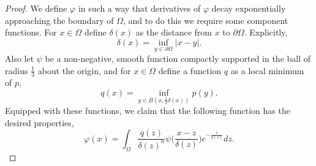 \documentclass[oneside,hidelinks,indentfirst,10pt]{book}
\begin{document}
\begin{proof}
We define \(\varphi\) in such a way that derivatives of \(\varphi\) decay exponentially approaching the boundary of \(\Omega\), and to do this we require some component functions. For \(x\in\Omega\) define \(\delta(x)\) as the distance from \(x\) to \(\partial\Omega\). Explicitly, 
\[
    \delta(x)=\inf_{y\in\partial\Omega}|x-y|.
\]
Also let \(\psi\) be a non-negative, smooth function compactly supported in the ball of radius \(\frac{1}{3}\) about the origin, and for \(x\in\Omega\) define a function \(q\) as a local minimum of \(p\),
\[
    q(x)=\inf_{y\in B(x,\frac{1}{2}\delta(x))}p(y).
\]
Equipped with these functions, we claim that the following function has the desired properties,
\[
    \varphi(x)=\int_{\Omega}\frac{q(z)}{\delta(z)^n}\psi\bigg(\frac{x-z}{\delta(z)}\bigg)e^{-\frac{1}{\delta(z)}}dz.
\]



\end{proof}
\end{document}
